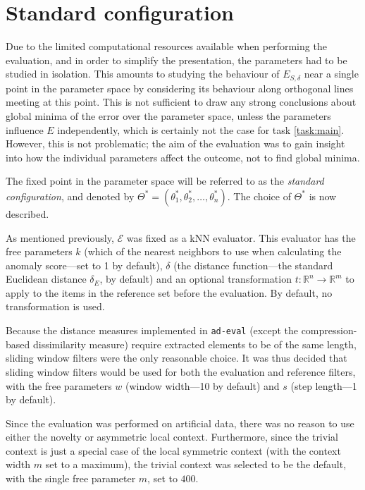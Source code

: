 \section{Standard configuration}
\label{sect:standard_config}

Due to the limited computational resources available when performing the evaluation, and in order to simplify the presentation, the parameters had to be studied in isolation. This amounts to studying the behaviour of $E_{S, \delta}$ near a single point in the parameter space by considering its behaviour along orthogonal lines meeting at this point. This is not sufficient to draw any strong conclusions about global minima of the error over the parameter space, unless the parameters influence $E$ independently, which is certainly not the case for task \ref{task:main}. However, this is not problematic; the aim of the evaluation was to gain insight into how the individual parameters affect the outcome, not to find global minima. 

The fixed point in the parameter space will be referred to as the \emph{standard configuration}, and denoted by $\Theta^* = (\theta_1^*, \theta_2^*, \dots, \theta_n^*)$. The choice of $\Theta^*$ is now described.

As mentioned previously, $\mathcal{E}$ was fixed as a kNN evaluator. This evaluator has the free parameters $k$ (which of the nearest neighbors to use when calculating the anomaly score---set to 1 by default), $\delta$ (the distance function---the standard Euclidean distance $\delta_E$, by default) and an optional transformation $t: \mathbb{R}^n \rightarrow \mathbb{R}^m$ to apply to the items in the reference set before the evaluation. By default, no transformation is used.

Because the distance measures implemented in \texttt{ad-eval} (except the compression-based dissimilarity measure) require extracted elements to be of the same length, sliding window filters were the only reasonable choice. It was thus decided that sliding window filters would be used for both the evaluation and reference filters, with the free parameters $w$ (window width---10 by default) and $s$ (step length---1 by default).

Since the evaluation was performed on artificial data, there was no reason to use either the novelty or asymmetric local context. Furthermore, since the trivial context is just a special case of the local symmetric context (with the context width $m$ set to a maximum), the trivial context was selected to be the default, with the single free parameter $m$, set to $400$.

